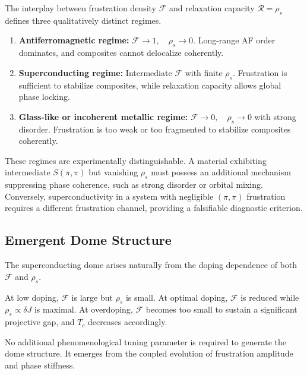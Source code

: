     The interplay between frustration density $\mathcal{F}$
    and relaxation capacity $\mathcal{R}=\rho_s$
    defines three qualitatively distinct regimes.

    \begin{enumerate}
      \item
      \textbf{Antiferromagnetic regime:}
      \(
      \mathcal{F} \rightarrow 1,
      \quad
      \rho_s \rightarrow 0
      \).
      Long-range AF order dominates,
      and composites cannot delocalize coherently.

      \item
      \textbf{Superconducting regime:}
      Intermediate $\mathcal{F}$
      with finite $\rho_s$.
      Frustration is sufficient to stabilize composites,
      while relaxation capacity allows global phase locking.

      \item
      \textbf{Glass-like or incoherent metallic regime:}
      \(
      \mathcal{F} \rightarrow 0,
      \quad
      \rho_s \rightarrow 0
      \)
      with strong disorder.
      Frustration is too weak or too fragmented
      to stabilize composites coherently.
    \end{enumerate}

    These regimes are experimentally distinguishable.
    A material exhibiting intermediate $S(\pi,\pi)$
    but vanishing $\rho_s$
    must possess an additional mechanism suppressing
    phase coherence,
    such as strong disorder or orbital mixing.
    Conversely,
    superconductivity in a system
    with negligible $(\pi,\pi)$ frustration
    requires a different frustration channel,
    providing a falsifiable diagnostic criterion.

  \subsection{Emergent Dome Structure}
    \label{subsec:dome-final}

    The superconducting dome arises naturally
    from the doping dependence of both $\mathcal{F}$ and $\rho_s$.

    At low doping,
    $\mathcal{F}$ is large but $\rho_s$ is small.
    At optimal doping,
    $\mathcal{F}$ is reduced
    while $\rho_s \propto \delta J$ is maximal.
    At overdoping,
    $\mathcal{F}$ becomes too small
    to sustain a significant projective gap,
    and $T_c$ decreases accordingly.

    No additional phenomenological tuning parameter
    is required to generate the dome structure.
    It emerges from the coupled evolution
    of frustration amplitude and phase stiffness.
